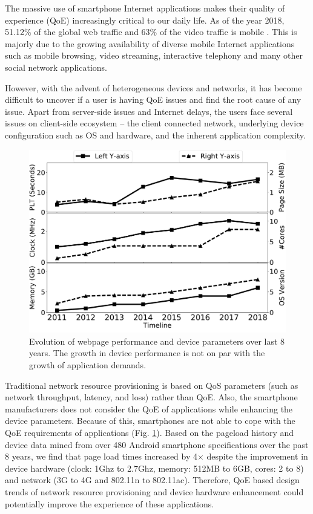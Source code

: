 The massive use of smartphone Internet applications makes their quality of experience (QoE) increasingly critical to our daily life. 
As of the year 2018, 51.12\% of the global web traffic and 63\% of the video traffic is mobile \cite{statista2}. 
This is majorly due to the growing availability of diverse mobile Internet applications such as mobile browsing, video streaming, interactive telephony and many other social network applications.

However, with the advent of heterogeneous devices and networks, it has become difficult to uncover if a user is having QoE issues and find the root cause of any issue. 
Apart from server-side issues and Internet delays, the users face several issues on client-side ecosystem -- the client connected network, underlying device configuration such as OS and hardware, and the inherent application complexity.

\begin{figure}[t]
\centering
\includegraphics[width=0.85\linewidth]{sections/evolv}
\vspace{-0.3cm}
\caption{Evolution of webpage performance and device parameters over last 8 years. The growth in device performance is not on par with the growth of application demands.}
\label{fig:evolv}
\vspace{-0.6cm}
\end{figure}

Traditional network resource provisioning is based on QoS parameters (such as network throughput, latency, and loss) rather than QoE. 
Also, the smartphone manufacturers does not consider the QoE of applications while enhancing the device parameters.
Because of this, smartphones are not able to cope with the QoE requirements of applications (Fig. \ref{fig:evolv}).
Based on the pageload history \cite{htarch} and device data mined from over 480 Android smartphone specifications over the past 8 years, we find that page load times increased by 4$\times$ despite the improvement in device hardware (clock: 1Ghz to 2.7Ghz, memory: 512MB to 6GB, cores: 2 to 8) and network (3G to 4G and 802.11n to 802.11ac).
Therefore, QoE based design trends of network resource provisioning and device hardware enhancement could potentially improve the experience of these applications.

